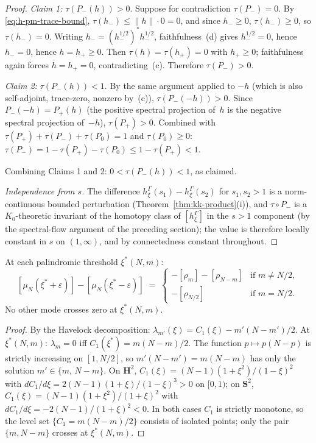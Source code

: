 \begin{proof}
\emph{Claim 1:} $\tau(P_-(h)) > 0$.
Suppose for contradiction $\tau(P_-) = 0$.  By
\eqref{eq:h-pm-trace-bound}, $\tau(h_-) \le \|h\|\cdot 0 = 0$,
and since $h_- \ge 0$, $\tau(h_-) \ge 0$, so $\tau(h_-) = 0$.
Writing $h_- = (h_-^{1/2})^* h_-^{1/2}$, faithfulness~(d)
gives $h_-^{1/2} = 0$, hence $h_- = 0$, hence $h = h_+ \ge 0$.
Then $\tau(h) = \tau(h_+) = 0$ with $h_+ \ge 0$; faithfulness
again forces $h = h_+ = 0$, contradicting~(c).  Therefore
$\tau(P_-) > 0$.

\emph{Claim 2:} $\tau(P_-(h)) < 1$.
By the same argument applied to $-h$ (which is also self-adjoint,
trace-zero, nonzero by~(c)), $\tau(P_-(-h)) > 0$.  Since
$P_-(-h) = P_+(h)$ (the positive spectral projection of~$h$
is the negative spectral projection of~$-h$), $\tau(P_+) > 0$.
Combined with $\tau(P_+) + \tau(P_-) + \tau(P_0) = 1$ and
$\tau(P_0) \ge 0$: $\tau(P_-) = 1 - \tau(P_+) - \tau(P_0)
\le 1 - \tau(P_+) < 1$.

Combining Claims 1 and 2: $0 < \tau(P_-(h)) < 1$, as claimed.

\emph{Independence from $s$.}
The difference $h_{\xi}^\Gamma(s_1) - h_{\xi}^\Gamma(s_2)$ for
$s_1, s_2 > 1$ is a norm-continuous bounded perturbation
(Theorem~\ref{thm:kk-product}(i)), and $\tau \circ P_-$ is a
$K_0$-theoretic invariant of the homotopy class of
$[h_\xi^\Gamma]$ in the $s > 1$ component
(by the spectral-flow argument of the preceding section);
the value is therefore locally constant in $s$ on $(1, \infty)$,
and by connectedness constant throughout.
\end{proof}

\begin{theorem}
\label{thm:wall-crossing}
At each palindromic threshold $\xi^*(N,m)$:
\[
  [\mu_N(\xi^*{+}\varepsilon)]
  - [\mu_N(\xi^*{-}\varepsilon)]
  \;=\;
  \begin{cases}
    -[\rho_m] - [\rho_{N-m}]
      & \text{if } m \ne N/2, \\[3pt]
    -[\rho_{N/2}]
      & \text{if } m = N/2.
  \end{cases}
\]
No other mode crosses zero at $\xi^*(N,m)$.
\end{theorem}

\begin{proof}
By the Havelock decomposition:
$\lambda_{m'}(\xi) = C_1(\xi) - m'(N{-}m')/2$.
At $\xi^*(N,m)$: $\lambda_m = 0$ iff
$C_1(\xi^*) = m(N{-}m)/2$.
The function $p \mapsto p(N{-}p)$ is strictly increasing
on $[1, N/2]$, so $m'(N{-}m') = m(N{-}m)$ has only the
solution $m' \in \{m,\, N{-}m\}$.
On $\mathbf{H}^2$, $C_1(\xi) = (N{-}1)(1{+}\xi^2)/(1{-}\xi)^2$
with $dC_1/d\xi = 2(N{-}1)(1{+}\xi)/(1{-}\xi)^3 > 0$
on $[0, 1)$; on $\mathbf{S}^2$, $C_1(\xi) = (N{-}1)(1{+}\xi^2)/(1{+}\xi)^2$
with $dC_1/d\xi = -2(N{-}1)/(1{+}\xi)^2 < 0$.
In both cases $C_1$ is strictly monotone, so the level set
$\{C_1 = m(N{-}m)/2\}$ consists of isolated points;
only the pair $\{m, N{-}m\}$ crosses at $\xi^*(N,m)$.
\end{proof}


